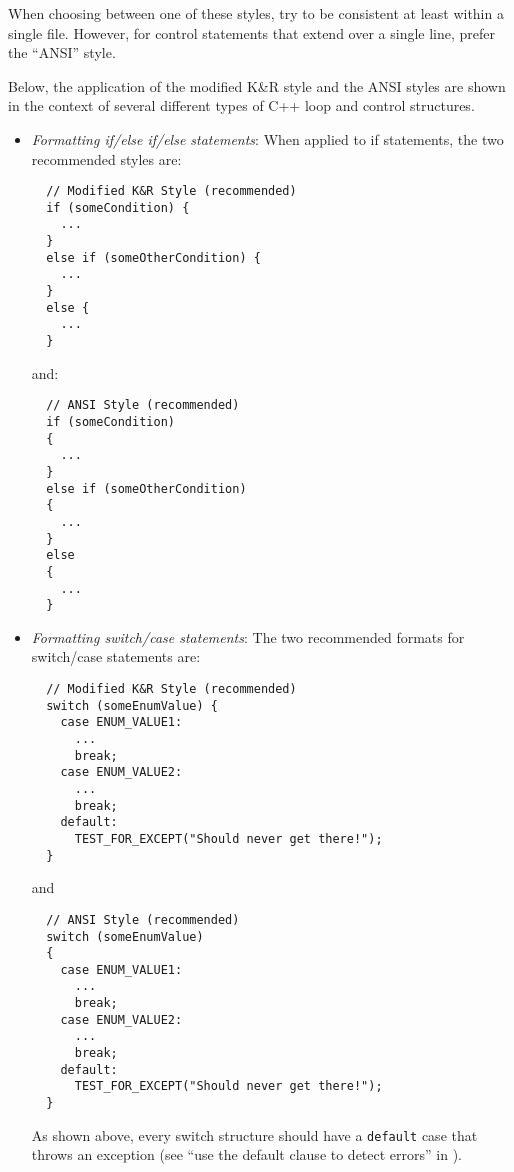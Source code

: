 \begin{itemize}
When choosing between one of these styles, try to be consistent at least
within a single file.  However, for control statements that extend over a
single line, prefer the ``ANSI'' style.

Below, the application of the modified K\&R style and the ANSI styles are
shown in the context of several different types of C++ loop and control
structures.

  \begin{itemize}

  {}\item\textit{Formatting if/else if/else
  statements}: When applied to if statements, the two recommended styles are:

  {\small\begin{verbatim}
  // Modified K&R Style (recommended)
  if (someCondition) {
    ...
  }
  else if (someOtherCondition) {
    ...
  }
  else {
    ...
  }
  \end{verbatim}}
  
  {}\noindent{}and:
  
  {\small\begin{verbatim}
  // ANSI Style (recommended)
  if (someCondition)
  {
    ...
  }
  else if (someOtherCondition)
  {
    ...
  }
  else
  {
    ...
  }
  \end{verbatim}}

  {}\item\textit{Formatting switch/case statements}:
  The two recommended formats for switch/case statements are:

  {\small\begin{verbatim}
  // Modified K&R Style (recommended)
  switch (someEnumValue) {
    case ENUM_VALUE1:
      ...
      break;
    case ENUM_VALUE2:
      ...
      break;
    default:
      TEST_FOR_EXCEPT("Should never get there!");
  }
  \end{verbatim}}

  {}\noindent{}and

  {\small\begin{verbatim}
  // ANSI Style (recommended)
  switch (someEnumValue)
  {
    case ENUM_VALUE1:
      ...
      break;
    case ENUM_VALUE2:
      ...
      break;
    default:
      TEST_FOR_EXCEPT("Should never get there!");
  }
  \end{verbatim}}

  As shown above, every switch structure should have a {}\texttt{default} case
  that throws an exception (see ``use the default clause to detect errors''
  in {}\cite[Section 15.1]{CodeComplete2nd04}).


\end{itemize}
\end{itemize}
